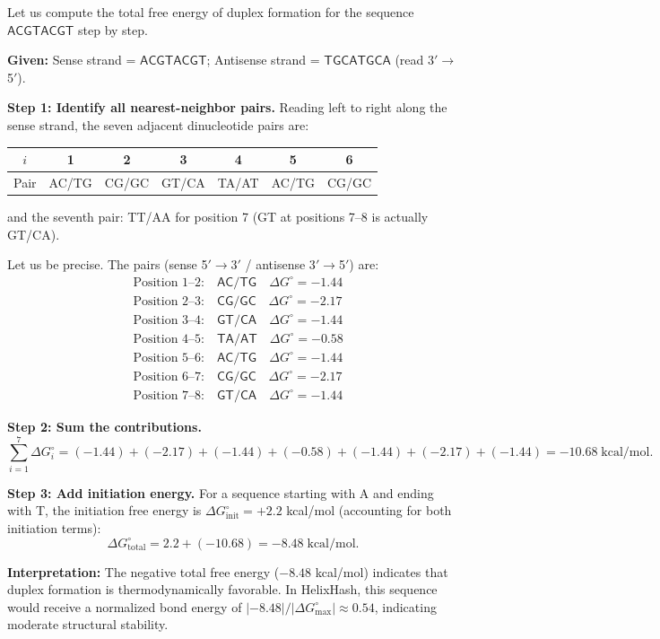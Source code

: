 Let us compute the total free energy of duplex formation for the sequence $\mathsf{ACGTACGT}$ step by step.

\begin{example}
\label{ex:free-energy}
\textbf{Given:} Sense strand = $\mathsf{ACGTACGT}$; Antisense strand = $\mathsf{TGCATGCA}$ (read 3\('\to\)5\('\)).

\textbf{Step 1: Identify all nearest-neighbor pairs.} Reading left to right along the sense strand, the seven adjacent dinucleotide pairs are:
\begin{center}
\begin{tabular}{ccccccc}
$i$ & 1 & 2 & 3 & 4 & 5 & 6 \\
\midrule
Pair & AC/TG & CG/GC & GT/CA & TA/AT & AC/TG & CG/GC \\
\end{tabular}
\end{center}
and the seventh pair: TT/AA for position 7 (GT at positions 7--8 is actually GT/CA).

Let us be precise. The pairs (sense 5\('\to\)3\('\) / antisense 3\('\to\)5\('\)) are:
\begin{align*}
&\text{Position 1--2:} \quad \mathsf{AC/TG} \quad \Delta G^{\circ} = -1.44 \\
&\text{Position 2--3:} \quad \mathsf{CG/GC} \quad \Delta G^{\circ} = -2.17 \\
&\text{Position 3--4:} \quad \mathsf{GT/CA} \quad \Delta G^{\circ} = -1.44 \\
&\text{Position 4--5:} \quad \mathsf{TA/AT} \quad \Delta G^{\circ} = -0.58 \\
&\text{Position 5--6:} \quad \mathsf{AC/TG} \quad \Delta G^{\circ} = -1.44 \\
&\text{Position 6--7:} \quad \mathsf{CG/GC} \quad \Delta G^{\circ} = -2.17 \\
&\text{Position 7--8:} \quad \mathsf{GT/CA} \quad \Delta G^{\circ} = -1.44
\end{align*}

\textbf{Step 2: Sum the contributions.}
\begin{equation*}
\sum_{i=1}^{7} \Delta G^{\circ}_i = (-1.44) + (-2.17) + (-1.44) + (-0.58) + (-1.44) + (-2.17) + (-1.44) = -10.68 \;\text{kcal/mol}.
\end{equation*}

\textbf{Step 3: Add initiation energy.} For a sequence starting with A and ending with T, the initiation free energy is $\Delta G^{\circ}_{\text{init}} = +2.2$ kcal/mol (accounting for both initiation terms):
\begin{equation*}
\Delta G^{\circ}_{\text{total}} = 2.2 + (-10.68) = -8.48 \;\text{kcal/mol}.
\end{equation*}

\textbf{Interpretation:} The negative total free energy ($-8.48$ kcal/mol) indicates that duplex formation is thermodynamically favorable. In HelixHash, this sequence would receive a normalized bond energy of $|-8.48| / |\Delta G^{\circ}_{\max}| \approx 0.54$, indicating moderate structural stability.
\end{example}

